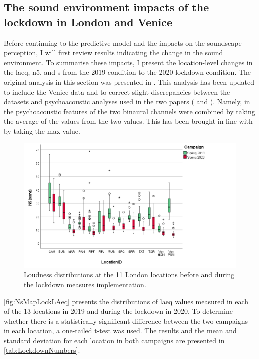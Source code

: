 
\subsection{The sound environment impacts of the lockdown in London and Venice}
\label{sec:LondonLockdown}

Before continuing to the predictive model and the impacts on the soundscape perception, I will first review results indicating the change in the sound environment. To summarise these impacts, I present the location-level changes in the \gls{laeq}, \gls{n5}, and \gls{s} from the 2019 condition to the 2020 lockdown condition. The original analysis in this section was presented in \citet{Aletta2020Assessing}. This analysis has been updated to include the Venice data and to correct slight discrepancies between the datasets and psychoacoustic analyses used in the two papers (\citet{Aletta2020Assessing} and \citet{Mitchell2021Investigating}). Namely, in \citet{Aletta2020Assessing} the psychoacoustic features of the two binaural channels were combined by taking the average of the values from the two values. This has been brought in line with \citet{Mitchell2021Investigating} by taking the max value.


\begin{figure}[h]
  \centering
  \includegraphics[width=.75\textwidth]{Figures/LockdownLoudness.png}
  \caption{Loudness distributions at the 11 London locations before and during the lockdown measures implementation. \label{fig:NsMapLockN5}}
\end{figure}

\cref{fig:NsMapLockLAeq} presents the distributions of \gls{laeq} values measured in each of the 13 locations in 2019 and during the lockdown in 2020. To determine whether there is a statistically significant difference between the two campaigns in each location, a one-tailed t-test was used. The results and the mean and standard deviation for each location in both campaigns are presented in \cref{tab:LockdownNumbers}. 

